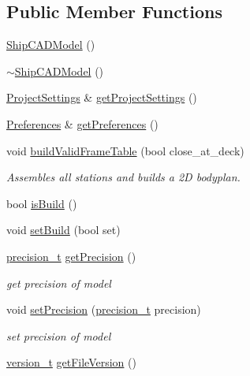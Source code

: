 \subsection*{Public Member Functions}
\begin{DoxyCompactItemize}
\item 
\hyperlink{classShipCAD_1_1ShipCADModel_abede72e53058c2ecf8dc2c4b2a7c8014}{Ship\-C\-A\-D\-Model} ()
\item 
\hyperlink{classShipCAD_1_1ShipCADModel_a69faa69f492a5aad941990319e5e88c0}{$\sim$\-Ship\-C\-A\-D\-Model} ()
\item 
\hyperlink{classShipCAD_1_1ProjectSettings}{Project\-Settings} \& \hyperlink{classShipCAD_1_1ShipCADModel_a94a8eed8ac8ff4ad8287a0a1113e3271}{get\-Project\-Settings} ()
\item 
\hyperlink{classShipCAD_1_1Preferences}{Preferences} \& \hyperlink{classShipCAD_1_1ShipCADModel_aa6af8872deba5b401ac575a85901a265}{get\-Preferences} ()
\item 
void \hyperlink{classShipCAD_1_1ShipCADModel_abefac47aa19318b4ae3c82108dfe4585}{build\-Valid\-Frame\-Table} (bool close\-\_\-at\-\_\-deck)
\begin{DoxyCompactList}\small\item\em Assembles all stations and builds a 2\-D bodyplan. \end{DoxyCompactList}\item 
bool \hyperlink{classShipCAD_1_1ShipCADModel_a0c7a15b80b5013066fd77f46e57850ef}{is\-Build} ()
\item 
void \hyperlink{classShipCAD_1_1ShipCADModel_ab221977f2a8bd4d51d6ee777be0d7b8a}{set\-Build} (bool set)
\item 
\hyperlink{namespaceShipCAD_ae13c7e36dfb1e2300741a631041cd915}{precision\-\_\-t} \hyperlink{classShipCAD_1_1ShipCADModel_a949318726227fe0ba274b34d2ea4528a}{get\-Precision} ()
\begin{DoxyCompactList}\small\item\em get precision of model \end{DoxyCompactList}\item 
void \hyperlink{classShipCAD_1_1ShipCADModel_a6133fe12cd13b6ce24424e19a8b1e433}{set\-Precision} (\hyperlink{namespaceShipCAD_ae13c7e36dfb1e2300741a631041cd915}{precision\-\_\-t} precision)
\begin{DoxyCompactList}\small\item\em set precision of model \end{DoxyCompactList}\item 
\hyperlink{namespaceShipCAD_af3a6fa23a7318acbda7b0066b53d694f}{version\-\_\-t} \hyperlink{classShipCAD_1_1ShipCADModel_a17ecfdd29efc03ed2580b89f5da955c8}{get\-File\-Version} ()

\end{DoxyCompactItemize}
